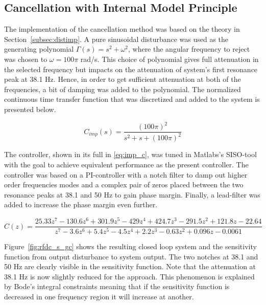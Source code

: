 \FloatBarrier
\subsection{Cancellation with Internal Model Principle}
The implementation of the \abbrIMP cancellation method was based on the theory in Section~\ref{subsec:distimp}. A pure sinusoidal disturbance was used as the generating polynomial $\Gamma(s) = s^2 + \omega^2$, where the angular frequency to reject was chosen to $\omega = 100\pi$ rad/s. This choice of polynomial gives full attenuation in the selected frequency but impacts on the attenuation of system's first resonance peak at 38.1 Hz. Hence, in order to get sufficient attenuation at both of the frequencies, a bit of damping was added to the polynomial. The normalized continuous time transfer function that was discretized and added to the system is presented below.

\begin{equation}
  C_{imp}(s) = \frac{(100\pi)^2}{s^2 + s + (100\pi)^2}
\end{equation}

The controller, shown in its full in \eqref{eq:imp_c}, was tuned in Matlabs's SISO-tool with the goal to achieve equivalent performance as the present controller. The controller was based on a PI-controller with a notch filter to damp out higher order frequencies modes and a complex pair of zeros placed between the two resonance peaks at 38.1 and 50 Hz to gain phase margin. Finally, a lead-filter was added to increase the phase margin even further.

\begin{equation}
  \label{eq:imp_c}
  C(z) = \frac{25.33z^7 - 130.6z^6 + 301.9z^5 - 429z^4 + 424.7z^3 - 291.5z^2 + 121.8z - 22.64}{z^7 - 3.6z^6 + 5.4z^5 - 4.5z^4 + 2.2z^3 - 0.63z^2 + 0.096z - 0.0061}
\end{equation}

Figure~\ref{fig:rfdc_s_gc} shows the resulting closed loop system and the sensitivity function from output disturbance to system output. The two notches at 38.1 and 50 Hz are clearly visible in the sensitivity function. Note that the attenuation at 38.1 Hz is now slightly reduced for the \abbrIMP approach. This phenomenon is explained by Bode's integral constraints \citep{Ljung:2003} meaning that if the sensitivity function is decreased in one frequency region it will increase at another.

